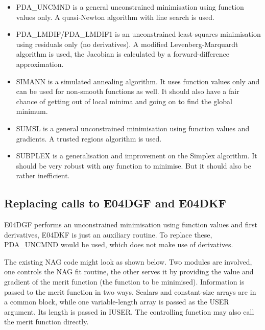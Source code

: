 \documentclass[11pt,twoside]{article}
\newcommand{\htmlref}[2]{#1}
\newcommand{\xlabel}[1]{}
\begin{document}
\begin{itemize}
\item
   PDA\_UNCMND is a general unconstrained minimisation using function values
   only. A quasi-Newton algorithm with line search is used.
\item
   PDA\_LMDIF/PDA\_LMDIF1 is an unconstrained least-squares minimisation using
   residuals only (no derivatives).
   A modified Levenberg-Marquardt algorithm is used, the Jacobian is
   calculated by a forward-difference approximation.
\item
   SIMANN is a simulated annealing algorithm. It uses function values
   only and can be used for non-smooth functions as well. It should also
   have a fair chance of getting out of local minima and going on to
   find the global minimum.
\item
   SUMSL is a general unconstrained minimisation using function values
   and gradients. A trusted regions algorithm is used.
\item
   SUBPLEX is a generalisation and improvement on the Simplex algorithm.
   It should be very robust with any function to minimise. But it should
   also be rather inefficient.
\end{itemize}


\subsection{\xlabel{replacing_calls_to_e04dgf_and_e04dkf}Replacing calls to E04DGF and E04DKF}

   E04DGF performs an unconstrained minimisation using function
   values and first derivatives, E04DKF is just an auxiliary routine. To
   replace these,
\htmlref{PDA\_UNCMND}{PDA\_UNCMND}
   would be used, which does not make use of
   derivatives.

   The existing NAG code might look as shown below. Two modules are
   involved, one controls the NAG fit routine, the other serves it by
   providing the value and gradient of the merit function (the function
   to be minimised). Information is passed to the merit function in two
   ways. Scalars and constant-size arrays are in a common block, while
   one variable-length array is passed as the USER argument. Its length
   is passed in IUSER. The controlling function may also call the merit
   function directly.
\end{document}
